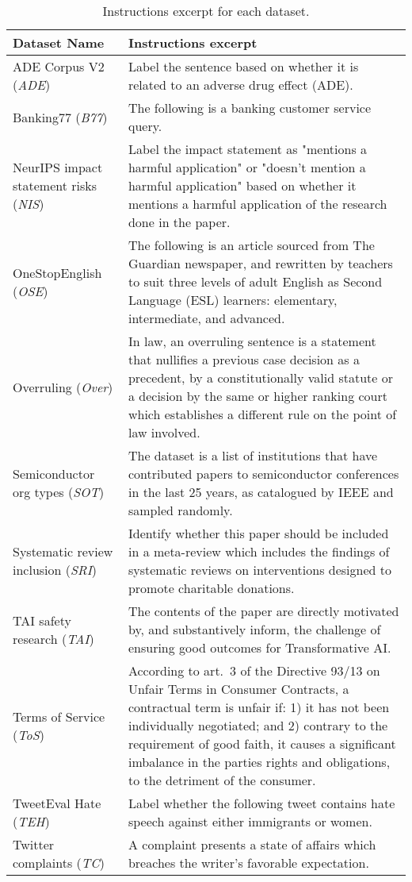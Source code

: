 \documentclass{article}
\begin{document}
\begin{table}[ht]
\centering
\begin{tabular}{m{8em}m{30em}}
\toprule
\textbf{Dataset Name} & Instructions excerpt \\
\midrule
ADE Corpus V2 (\textit{ADE}) & Label the sentence based on whether it is related to an adverse drug effect (ADE). \\ 
Banking77 (\textit{B77}) & The following is a banking customer service query. \\    
NeurIPS impact statement risks (\textit{NIS}) & Label the impact statement as "mentions a harmful application" or "doesn't mention a harmful application"  based on whether it mentions a harmful application of the research done in the paper. \\ 
OneStopEnglish (\textit{OSE}) & The following is an article sourced from The Guardian newspaper, and rewritten by teachers to suit three levels of adult English as Second Language (ESL) learners: elementary, intermediate, and advanced. \\ 
Overruling (\textit{Over}) & In law, an overruling sentence is a statement that nullifies a previous case decision as a precedent, by a constitutionally valid statute or a decision by the same or higher ranking court which establishes a different rule on the point of law involved.\\ 
Semiconductor org types (\textit{SOT}) & The dataset is a list of institutions that have contributed papers to semiconductor conferences in the last 25 years, as catalogued by IEEE and sampled randomly. \\ 
Systematic review inclusion (\textit{SRI}) & Identify whether this paper should be included in a meta-review which includes the findings of systematic reviews on interventions designed to promote charitable donations. \\ 
TAI safety research (\textit{TAI}) & The contents of the paper are directly motivated by, and substantively inform, the challenge of ensuring good outcomes for Transformative AI. \\ 
Terms of Service (\textit{ToS}) & According to art.\ 3 of the Directive 93/13 on Unfair Terms in Consumer Contracts, a contractual term is unfair if: 1) it has not been individually negotiated; and 2) contrary to the requirement of good faith, it causes a significant imbalance in the parties rights and obligations, to the detriment of the consumer. \\ 
TweetEval Hate (\textit{TEH}) & Label whether the following tweet contains hate speech against either immigrants or women. \\ 
Twitter complaints (\textit{TC}) & A complaint presents a state of affairs which breaches the writer’s favorable expectation. \\ 
\bottomrule
\end{tabular}
\caption{Instructions excerpt for each dataset.}
\label{tab:instruction-excerpts}
\end{table}
\end{document}
